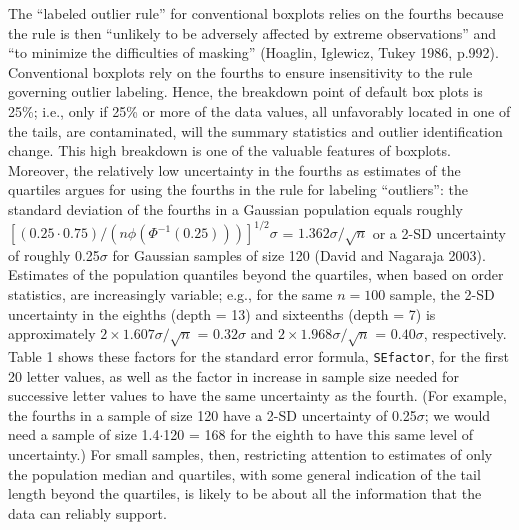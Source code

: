 \documentclass[11pt]{article}
\begin{document}
The ``labeled outlier rule'' for conventional boxplots relies 
on the fourths because the rule is then
``unlikely to be adversely affected by extreme
observations'' and ``to minimize the difficulties of masking'' 
(Hoaglin, Iglewicz, Tukey 1986, p.992).
Conventional boxplots rely on the fourths to ensure
insensitivity to the rule governing outlier labeling.
Hence, the breakdown point of default box plots is 25\%; 
i.e., only if 25\% or more of the data values, all unfavorably
located in one of the tails, are contaminated,
will the summary statistics and outlier identification change.
This high breakdown is one of the valuable features of boxplots.  
Moreover, the relatively low uncertainty in the fourths as 
estimates of the quartiles argues for using the fourths 
in the rule for labeling ``outliers'': the standard deviation 
of the fourths in a Gaussian population equals roughly 
$[(0.25 \cdot 0.75) / (n  \phi(\Phi^{-1}(0.25)))]^{1/2} \sigma$
= $1.362 \sigma / \sqrt{n}$ 
or a 2-SD uncertainty
of roughly 0.25$\sigma$ for Gaussian samples of size 120 
(David and Nagaraja 2003).
Estimates of the population quantiles beyond the quartiles, when
based on order statistics, are increasingly variable; e.g., for
the same $n = 100$ sample, the 2-SD uncertainty in the eighths
(depth = 13) and sixteenths (depth = 7) is approximately
$ 2 \times 1.607 \sigma / \sqrt{n}$ = $0.32 \sigma$ and
$ 2 \times 1.968 \sigma / \sqrt{n}$ = $0.40 \sigma$, respectively.
Table 1 shows these factors for the standard error formula,
\texttt{SEfactor}, for the first 20 letter values, as well as
the factor in increase in sample size needed for successive
letter values to have the same uncertainty as the fourth.
(For example, the fourths in a sample of size 120 have
a 2-SD uncertainty of 0.25$\sigma$; we would need a sample
of size 1.4$\cdot$120 = 168 for the eighth to have this
same level of uncertainty.)
For small samples, then, restricting attention to estimates of only
the population median and quartiles, with some general indication of 
the tail length beyond the quartiles, is likely to be about all the
information that the data can reliably support.
\end{document}
